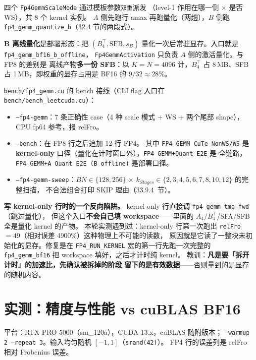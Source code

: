四个 \texttt{Fp4GemmScaleMode} 通过模板参数\texttt{双重}派发
（level-1 作用在哪一侧 $\times$ 是否 WS），共 8 个 kernel 实例。
$A$ 侧先跑行 amax 再跑量化（两趟），$B$ 侧跑
\texttt{fp4\_gemm\_quantize\_b}（32.4 节的两段式）。

\textbf{B 离线量化}是部署形态：把
$(B_4^{\top}, \mathrm{SFB}, s_B)$ 量化一次后常驻显存。入口就是
\texttt{fp4\_gemm\_bf16\_b\_offline}，
\texttt{Fp4GemmActivation} 只负责 $A$ 侧的激活量化。与 FP8 的差别是
离线产物\textbf{多一份 SFB}：以 $K{=}N{=}4096$ 计，$B_4^{\top}$ 占
8\,MB、SFB 占 1\,MB，即权重的显存占用是 BF16 的
$9/32\approx28\%$。

\texttt{bench/fp4\_gemm.cu} 的 bench 接线（CLI flag 入口在 \texttt{bench/bench\_leetcuda.cu}）：

\begin{itemize}[itemsep=2pt,topsep=3pt]
  \item \texttt{--fp4-gemm}：7 条正确性 case（4 种 scale 模式 $+$ WS
        $+$ 两个尾部 shape），CPU fp64 参考，报 relFro。
  \item \texttt{--bench}：在 FP8 行之后追加 12 行 FP4。
        其中 \texttt{FP4 GEMM CuTe NonWS/WS} 是 \textbf{kernel-only}
        口径（量化在计时窗口外），\texttt{FP4 GEMM+Quant E2E} 是
        全链路，\texttt{FP4 GEMM+A Quant E2E (B offline)} 是部署口径。
  \item \texttt{--fp4-gemm-sweep}：$BN\in\{128,256\}$ $\times$
        $k_{Stages}\in\{2,3,4,5,6,7,8,10,12\}$ 的完整扫描，
        不合法组合打印 SKIP 理由（33.9.4~节）。
\end{itemize}

\textbf{写 kernel-only 行时的一个反向陷阱。}
kernel-only 行直接调 \texttt{fp4\_gemm\_tma\_fwd}（跳过量化），
但这个入口\textbf{不会自己填 workspace}——里面的
$A_4/B_4^{\top}$/SFA/SFB 全是量化 kernel 的产物。
本轮实测遇到过：kernel-only 行第一次跑出
\texttt{relFro}$=49$（相对误差 4900\%）这种物理上不可能的读数，
原因就是它读了一整块未初始化的显存。修复是在
\texttt{FP4\_RUN\_KERNEL} 宏的第一行先跑一次完整的
\texttt{fp4\_gemm\_bf16} 把 workspace 填好，之后才计时纯 kernel。
教训：\textbf{凡是要「拆开计时」的加速比，先确认被拆掉的阶段
留下的是有效数据}——否则量到的是显存的随机内容。

\section{实测：精度与性能 vs cuBLAS BF16}\label{sec:37-perf}

平台：RTX PRO 5000（sm\_120a），CUDA 13.x，cuBLAS 随附版本；
\texttt{--warmup 2 --repeat 3}。输入均匀随机 $[-1,1]$（\texttt{srand(42)}）。
FP4 行的误差列是 relFro 相对 Frobenius 误差。

